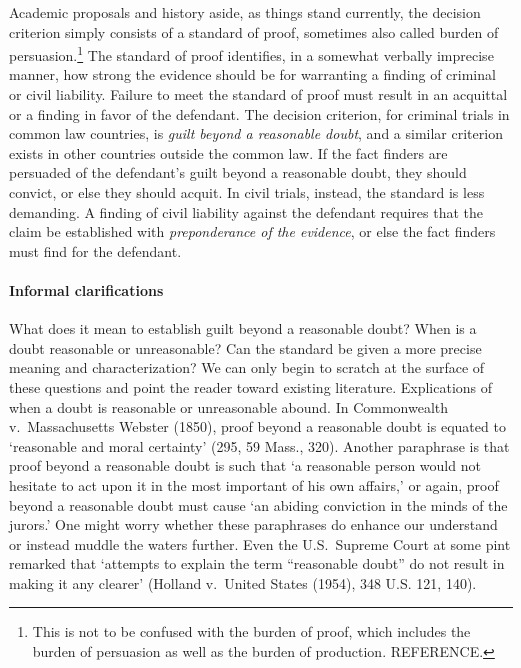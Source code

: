 \documentclass[10pt]{article}
\begin{document}
Academic proposals and history aside, as things stand currently, the decision 
criterion simply consists of a standard of proof, sometimes also called burden of persuasion.\footnote{This is not to be confused with the burden of proof, which includes the burden of persuasion as well as the burden of production. REFERENCE.} The standard of proof identifies, in a somewhat verbally imprecise manner, how strong the evidence should be for warranting a finding of criminal or civil liability. Failure to meet the standard of proof must result in an acquittal or a finding in favor of the defendant. The decision criterion, for criminal trials in common law countries, is \textit{guilt beyond a reasonable doubt}, and a similar criterion exists in other countries outside the common law. If the fact finders are persuaded of the defendant's guilt beyond a reasonable doubt, they should convict, or else they should acquit. In civil trials, instead, the standard is less demanding. A finding of civil liability against the defendant requires that the claim be established with \textit{preponderance of the evidence}, or else the fact finders must find for the defendant. 

  
  \paragraph{Informal clarifications}
  What does  it mean to establish guilt beyond a reasonable doubt? When is a doubt reasonable or unreasonable? Can the standard be given a more precise meaning and characterization? We can only begin to scratch at the surface of these questions and point the reader toward existing literature. Explications of when a doubt is reasonable or unreasonable abound. In Commonwealth v.\ Massachusetts Webster (1850), proof beyond a reasonable doubt is equated to `reasonable and moral certainty' (295, 59 Mass., 320).  Another paraphrase is that proof beyond a reasonable doubt is such that `a reasonable person would not hesitate to act upon it in the most important of his own affairs,' or again, proof beyond a reasonable doubt must cause `an abiding conviction in the minds of the jurors.' One might worry whether these paraphrases do enhance our understand or instead muddle the waters further. Even the U.S.\ Supreme Court at some pint remarked that `attempts to explain the term ``reasonable doubt'' do not result in making it any clearer' (Holland v.\ United States (1954), 348 U.S. 121, 140). 

\end{document}
